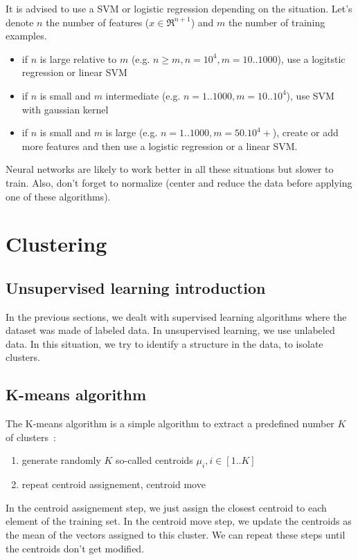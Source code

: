 \documentclass[10pt,a4paper]{article}
\begin{document}
It is advised to use a SVM or logistic regression depending on the situation. Let's denote $n$ the number of features ($x \in \Re^{n+1}$) and $m$ the number of training examples.
\begin{itemize}
\item if $n$ is large relative to $m$ (e.g. $n \geq m, n=10^4, m=10..1000$), use a logitstic regression or linear SVM
\item if $n$ is small and $m$ intermediate (e.g. $n = 1.. 1000, m= 10..10^4$), use SVM with gaussian kernel
\item if $n$ is small and $m$ is large (e.g. $n=1..1000, m=50.10^4+$), create or add more features and then use a logistic regression or a linear SVM.
\end{itemize}
Neural networks are likely to work better in all these situations but slower to train. Also, don't forget to normalize (center and reduce the data before applying one of these algorithms).

\section{Clustering}

\subsection{Unsupervised learning introduction}

In the previous sections, we dealt with supervised learning algorithms where the dataset was made of labeled data. In unsupervised learning, we use unlabeled data. In this situation, we try to identify a structure in the data, to isolate clusters.

\subsection{K-means algorithm}

The K-means algorithm is a simple algorithm to extract a predefined number $K$ of clusters~:
\begin{enumerate}
\item generate randomly $K$ so-called centroids $\mu_i, i\in[1..K]$
\item repeat centroid assignement, centroid move
\end{enumerate}
In the centroid assignement step, we just assign the closest centroid to each element of the training set. In the centroid move step, we update the centroids as the mean of the vectors assigned to this cluster. We can repeat these steps until the centroids don't get modified.\\
\end{document}
